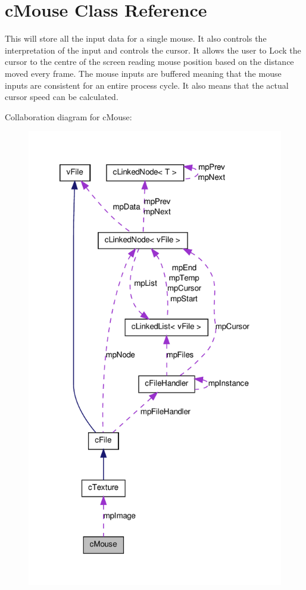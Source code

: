 \hypertarget{classc_mouse}{
\section{cMouse Class Reference}
\label{classc_mouse}
}


This will store all the input data for a single mouse. It also controls the interpretation of the input and controls the cursor. It allows the user to Lock the cursor to the centre of the screen reading mouse position based on the distance moved every frame. The mouse inputs are buffered meaning that the mouse inputs are consistent for an entire process cycle. It also means that the actual cursor speed can be calculated.  




Collaboration diagram for cMouse:\nopagebreak
\begin{figure}[H]
\begin{center}
\leavevmode
\includegraphics[width=320pt]{classc_mouse__coll__graph}
\end{center}
\end{figure}
